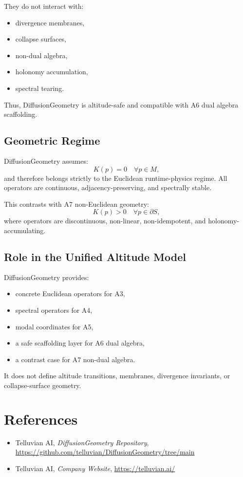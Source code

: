 They do not interact with:
\begin{itemize}
  \item divergence membranes,
  \item collapse surfaces,
  \item non-dual algebra,
  \item holonomy accumulation,
  \item spectral tearing.
\end{itemize}

Thus, DiffusionGeometry is altitude-safe and compatible with A6 dual algebra
scaffolding.

\subsection{Geometric Regime}

DiffusionGeometry assumes:
\[
K(p) = 0 \quad \forall p \in M,
\]
and therefore belongs strictly to the Euclidean runtime-physics regime. All
operators are continuous, adjacency-preserving, and spectrally stable.

This contrasts with A7 non-Euclidean geometry:
\[
K(p) > 0 \quad \forall p \in \partial S,
\]
where operators are discontinuous, non-linear, non-idempotent, and holonomy-
accumulating.

\subsection{Role in the Unified Altitude Model}

DiffusionGeometry provides:
\begin{itemize}
  \item concrete Euclidean operators for A3,
  \item spectral operators for A4,
  \item modal coordinates for A5,
  \item a safe scaffolding layer for A6 dual algebra,
  \item a contrast case for A7 non-dual algebra.
\end{itemize}

It does not define altitude transitions, membranes, divergence invariants, or
collapse-surface geometry.

\section*{References}

\begin{itemize}
  \item Telluvian AI, \emph{DiffusionGeometry Repository},  
        \url{https://github.com/telluvian/DiffusionGeometry/tree/main}
  \item Telluvian AI, \emph{Company Website},  
        \url{https://telluvian.ai/}
\end{itemize}


